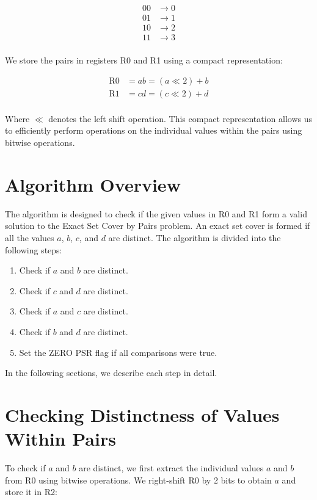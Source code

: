 \begin{align*}
00 &\rightarrow 0 \\
01 &\rightarrow 1 \\
10 &\rightarrow 2 \\
11 &\rightarrow 3 \\
\end{align*}

We store the pairs in registers R0 and R1 using a compact representation:

\begin{align*}
\text{R0} &= ab = (a \ll 2) + b \\
\text{R1} &= cd = (c \ll 2) + d \\
\end{align*}

Where $\ll$ denotes the left shift operation. This compact representation allows us to efficiently perform operations on the individual values within the pairs using bitwise operations.

\section{Algorithm Overview}

The algorithm is designed to check if the given values in R0 and R1 form a valid solution to the Exact Set Cover by Pairs problem. An exact set cover is formed if all the values $a$, $b$, $c$, and $d$ are distinct. The algorithm is divided into the following steps:

\begin{enumerate}
    \item Check if $a$ and $b$ are distinct.
    \item Check if $c$ and $d$ are distinct.
    \item Check if $a$ and $c$ are distinct.
    \item Check if $b$ and $d$ are distinct.
    \item Set the ZERO PSR flag if all comparisons were true.
\end{enumerate}

In the following sections, we describe each step in detail.

\section{Checking Distinctness of Values Within Pairs}

To check if $a$ and $b$ are distinct, we first extract the individual values $a$ and $b$ from R0 using bitwise operations. We right-shift R0 by 2 bits to obtain $a$ and store it in R2:

